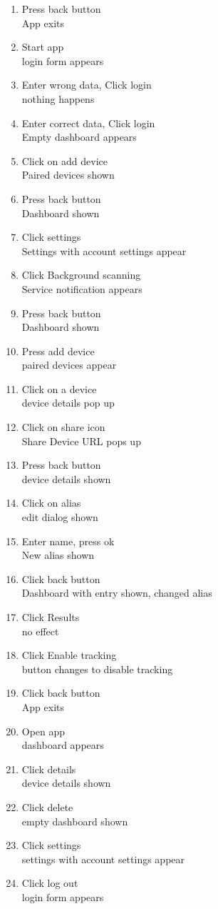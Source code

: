 \begin{enumerate}
\item Press back button \\ App exits
\item Start app \\ login form appears
\item Enter wrong data, Click login \\ nothing happens
\item Enter correct data, Click login \\ Empty dashboard appears
\item Click on add device \\ Paired devices shown
\item Press back button \\ Dashboard shown
\item Click settings \\ Settings with account settings appear
\item Click Background scanning \\ Service notification appears
\item Press back button \\ Dashboard shown
\item Press add device \\ paired devices appear
\item Click on a device \\ device details pop up
\item Click on share icon \\ Share Device URL pops up
\item Press back button \\ device details shown
\item Click on alias \\ edit dialog shown
\item Enter name, press ok \\ New alias shown
\item Click back button \\ Dashboard with entry shown, changed alias
\item Click Results \\ no effect
\item Click Enable tracking \\ button changes to disable tracking
\item Click back button \\ App exits
\item Open app \\ dashboard appears
\item Click details \\ device details shown
\item Click delete \\ empty dashboard shown
\item Click settings \\ settings with account settings appear
\item Click log out \\ login form appears
\end{enumerate}
